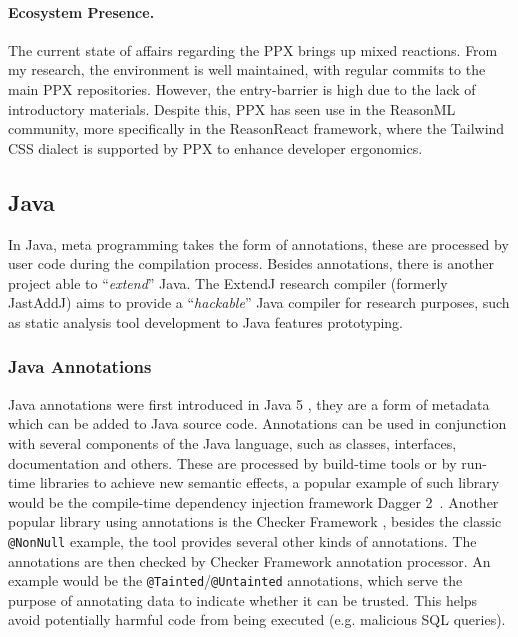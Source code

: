 \begin{displayquote}
	\begin{compactitem}
		\item \texttt{[%
		\item \texttt{[%
	\end{compactitem}
\end{displayquote}

\paragraph{Ecosystem Presence.}
The current state of affairs regarding the PPX brings up mixed reactions.
From my research, the environment is well maintained, with regular commits to the main PPX repositories.
However, the entry-barrier is high due to the lack of introductory materials.
Despite this, PPX has seen use in the ReasonML community, more specifically in the ReasonReact framework,
where the Tailwind CSS dialect is supported by PPX to enhance developer ergonomics.

\subsection{Java}\label{sec:lang-preprocessors:java}

In Java, meta programming takes the form of annotations, these are processed by user code during the compilation process.
Besides annotations, there is another project able to “\emph{extend}” Java.
The ExtendJ research compiler (formerly JastAddJ) \autocite{Ekman2007} aims to provide a “\emph{hackable}” Java compiler for research purposes,
such as static analysis tool development to Java features prototyping.

\subsubsection*{Java Annotations}\label{sec:lang-preprocessors:java:annotation}

Java annotations were first introduced in Java 5 \autocite{JSR269},
they are a form of metadata which can be added to Java source code.
Annotations can be used in conjunction with several components of the Java language,
such as classes, interfaces, documentation and others.
These are processed by build-time tools or by run-time libraries to achieve new semantic effects,
a popular example of such library would be the compile-time dependency injection framework Dagger 2~\autocite{Dagger2}.
Another popular library using annotations is the Checker Framework \autocite{CheckerFramework2018},
besides the classic \texttt{@NonNull} example, the tool provides several other kinds of annotations.
The annotations are then checked by Checker Framework annotation processor.
An example would be the \texttt{@Tainted}/\texttt{@Untainted} annotations,
which serve the purpose of annotating data to indicate whether it can be trusted.
This helps avoid potentially harmful code from being executed (e.g. malicious SQL queries).


